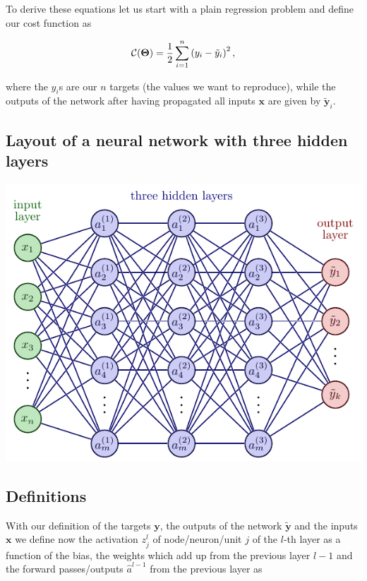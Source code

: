 \documentclass[%
oneside,                 %
final,                   %
10pt]{article}
\begin{document}
To derive these equations let us start with a plain regression problem
and define our cost function as

\[
{\cal C}(\bm{\Theta})  =  \frac{1}{2}\sum_{i=1}^n\left(y_i - \tilde{y}_i\right)^2, 
\]

where the $y_i$s are our $n$ targets (the values we want to
reproduce), while the outputs of the network after having propagated
all inputs $\bm{x}$ are given by $\bm{\tilde{y}}_i$.

\subsection{Layout of a neural network with three hidden layers}

\vspace{6mm}

\centerline{\includegraphics[width=1.0\linewidth]{figures/nn1.pdf}}

\vspace{6mm}

\subsection{Definitions}

With our definition of the targets $\bm{y}$, the outputs of the
network $\bm{\tilde{y}}$ and the inputs $\bm{x}$ we
define now the activation $z_j^l$ of node/neuron/unit $j$ of the
$l$-th layer as a function of the bias, the weights which add up from
the previous layer $l-1$ and the forward passes/outputs
$\hat{a}^{l-1}$ from the previous layer as
\end{document}
